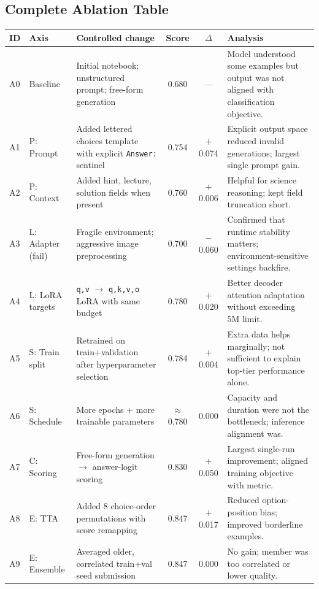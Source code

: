 \documentclass[11pt,twocolumn]{article}
\begin{document}
\subsection{Complete Ablation Table}

\begin{table}[t]
\centering
\small
\setlength{\tabcolsep}{4pt}
\renewcommand{\arraystretch}{1.1}
\begin{tabular}{p{0.6cm}p{1.9cm}p{4.4cm}cc p{5.2cm}}
\toprule
\textbf{ID} & \textbf{Axis} & \textbf{Controlled change} & \textbf{Score} & \textbf{$\Delta$} & \textbf{Analysis}\\
\midrule
A0 & Baseline       & Initial notebook; unstructured prompt; free-form generation & 0.680 & --- & Model understood some examples but output was not aligned with classification objective.\\
A1 & P: Prompt      & Added lettered choices template with explicit \texttt{Answer:} sentinel & 0.754 & $+$0.074 & Explicit output space reduced invalid generations; largest single prompt gain.\\
A2 & P: Context     & Added hint, lecture, solution fields when present & 0.760 & $+$0.006 & Helpful for science reasoning; kept field truncation short.\\
A3 & L: Adapter (fail) & Fragile environment; aggressive image preprocessing & 0.700 & $-$0.060 & Confirmed that runtime stability matters; environment-sensitive settings backfire.\\
A4 & L: LoRA targets & \texttt{q,v} $\to$ \texttt{q,k,v,o} LoRA with same budget & 0.780 & $+$0.020 & Better decoder attention adaptation without exceeding 5M limit.\\
A5 & S: Train split & Retrained on train+validation after hyperparameter selection & 0.784 & $+$0.004 & Extra data helps marginally; not sufficient to explain top-tier performance alone.\\
A6 & S: Schedule    & More epochs + more trainable parameters & $\approx$0.780 & 0.000 & Capacity and duration were not the bottleneck; inference alignment was.\\
A7 & C: Scoring     & Free-form generation $\to$ answer-logit scoring & 0.830 & $+$0.050 & Largest single-run improvement; aligned training objective with metric.\\
A8 & E: TTA         & Added 8 choice-order permutations with score remapping & 0.847 & $+$0.017 & Reduced option-position bias; improved borderline examples.\\
A9 & E: Ensemble    & Averaged older, correlated train+val seed submission & 0.847 & 0.000 & No gain; member was too correlated or lower quality.\\

\end{tabular}
\end{table}
\end{document}
